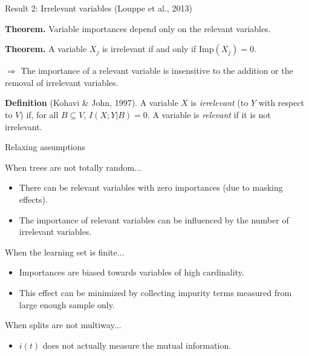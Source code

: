 \documentclass{beamer}
\begin{document}
\begin{frame}{Result 2: Irrelevant variables {\scriptsize (Louppe et al., 2013)}}

{\bf Theorem.} Variable importances depend only on the relevant variables.

\vspace{1cm}

{\bf Theorem.} A variable $X_j$ is irrelevant if and only if $\text{Imp}(X_j)= 0$.

\vspace{1cm}

{\color{blue} $\Rightarrow$ The importance of a relevant variable is
insensitive  to the addition or the removal of irrelevant variables.}

\vspace{1cm}


{\scriptsize \textbf{Definition} {\scriptsize (Kohavi \& John, 1997)}. A variable $X$ is
{\it irrelevant} (to $Y$ with respect to $V$) if, for all $B\subseteq V$,
$I(X;Y|B)=0$. A variable is {\it relevant} if it is not irrelevant.}

\end{frame}

\begin{frame}{Relaxing assumptions}

\begin{block}{When trees are not totally random...}

\begin{itemize}
\item  There can be {\color{red} relevant variables with zero
importances} (due to masking effects).
\item   The importance of relevant variables can be
{\color{red} influenced by the number of irrelevant variables}.
\end{itemize}

\end{block}

\begin{block}{When the learning set is finite...}
\begin{itemize}
\item  Importances are {\color{red} biased towards variables of  high
cardinality}.

\item This effect can be minimized by collecting impurity
terms measured from large enough sample only.
\end{itemize}
\end{block}

\begin{block}{When splits are not multiway...}
\begin{itemize}
\item $i(t)$ does not actually measure the mutual information.
\end{itemize}
\end{block}

\end{frame}
\end{document}
